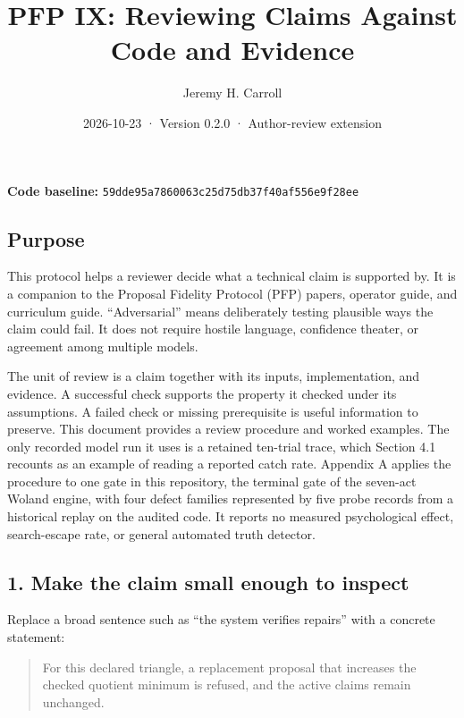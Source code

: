 \documentclass[
  11pt,
]{article}
\title{PFP IX: Reviewing Claims Against Code and Evidence}
\author{Jeremy H. Carroll}
\date{2026-10-23 · Version 0.2.0 · Author-review extension}
\begin{document}
\makeatletter
\begin{center}
{\LARGE \@title\par}
\vspace{0.8em}
{\normalsize \@author\par}
\vspace{0.5em}
{\small \@date\par}
\end{center}
\makeatother

\textbf{Code baseline:}
\nolinkurl{59dde95a7860063c25d75db37f40af556e9f28ee}

\subsection{Purpose}\label{purpose}

This protocol helps a reviewer decide what a technical claim is
supported by. It is a companion to the Proposal Fidelity Protocol (PFP)
papers, operator guide, and curriculum guide. ``Adversarial'' means
deliberately testing plausible ways the claim could fail. It does not
require hostile language, confidence theater, or agreement among
multiple models.

The unit of review is a claim together with its inputs, implementation,
and evidence. A successful check supports the property it checked under
its assumptions. A failed check or missing prerequisite is useful
information to preserve. This document provides a review procedure and
worked examples. The only recorded model run it uses is a retained
ten-trial trace, which Section 4.1 recounts as an example of reading a
reported catch rate. Appendix A applies the procedure to one gate in
this repository, the terminal gate of the seven-act Woland engine, with
four defect families represented by five probe records from a historical
replay on the audited code. It reports no measured psychological effect,
search-escape rate, or general automated truth detector.

\subsection{1. Make the claim small enough to
inspect}\label{make-the-claim-small-enough-to-inspect}

Replace a broad sentence such as ``the system verifies repairs'' with a
concrete statement:

\begin{quote}
For this declared triangle, a replacement proposal that increases the
checked quotient minimum is refused, and the active claims remain
unchanged.
\end{quote}
\end{document}

